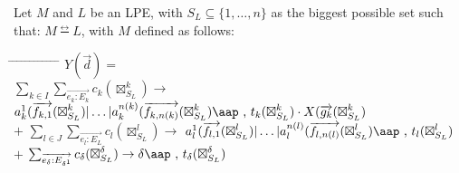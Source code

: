 \documentclass[a4paper,10pt]{article}
\theoremstyle{plain}
\theoremstyle{definition}
\newcommand{\ovr}{\overrightarrow}
\newcommand{\bisim}{\frac{\leftrightarrow}{}}
\newcommand{\tab}{\hspace*{5.mm} \= \hspace*{5.mm} \= \hspace*{5.mm} \= \hspace*{5.mm} \= \hspace*{5.mm} \= \hspace*{5.mm}  \= \hspace*{5.mm}  \= \hspace*{5.mm}  \= \hspace*{5.mm} \= \hspace*{5.mm} \= \hspace*{5.mm}  \= \hspace*{5.mm}  \= \hspace*{5.mm}\kill}
\newcommand{\at}[1]{\mbox{\aap ,} #1}
\begin{document}

\newcommand{\zi}{{\boxtimes}^k_{S_L}}
\newcommand{\zj}{{\boxtimes}^l_{S_L}}
\newcommand{\zd}{{\boxtimes}^\delta_{S_L}}


\begin{defn} \label{def:lpe:M} Let $M$ and $L$ be an LPE, with $ S_L \subseteq \lbrace 1, \ldots, n \rbrace $ as the biggest possible set such that:
$M \bisim L$, with $M$ defined as follows:
\begin{tabbing}
\tab
$Y(\ovr{d}) = $ \\ 
\> \>$\sum_{k \in I} \sum_{\ovr{e_k:E_k}} c_k ( \zi ) \rightarrow $
$ a_k^1 (\ovr{f_{k,1}}(\zi) \vert \ldots \vert a_k^{n(k)}(\ovr{f_{k,n(k)}}(\zi) \at \text{ } t_{k}(\zi)  \cdot X(\ovr{g_{k}}(\zi)
$ \\
\> $+ $\> $\sum_{l \in J} \sum_{\ovr{e_l:E_L}} c_l ( \zj ) \rightarrow $
$ a_{l}^1 (\ovr{f_{l,1}}(\zj) \vert \ldots \vert a_{l}^{n(l)}(\ovr{f_{l,n(l)}}(\zj) \at \text{ } t_{l}(\zj)
$ \\
\> $ + $ \> $ \sum_{\ovr{e_{\delta}:E_{\delta^1}}} c_{\delta} ( \zd ) \rightarrow 
{\delta} \at \text{ } t_{\delta}(\zd)$\\
\end{tabbing}
\end{defn}
\end{document}
